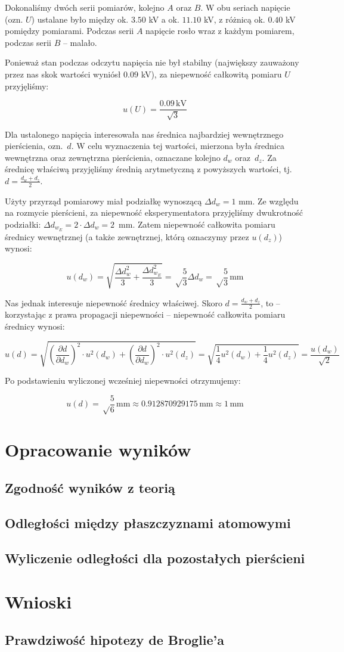 \documentclass[a4paper]{article}
\newlength{\du}
\begin{document}
Dokonaliśmy dwóch serii pomiarów, kolejno $A$ oraz $B$.
W obu seriach napięcie (ozn. $U$) ustalane było między ok. $3.50$ kV a ok. $11.10$ kV, z różnicą ok. $0.40$ kV pomiędzy pomiarami.
Podczas serii $A$ napięcie rosło wraz z każdym pomiarem, podczas serii $B$ -- malało.

Ponieważ stan podczas odczytu napięcia nie był stabilny (największy zauważony przez nas skok wartości wyniósł $0.09$ kV), za niepewność całkowitą pomiaru $U$ przyjęliśmy:

$$u(U) = \frac{0.09 \, \text{kV}}{\sqrt 3}$$

Dla ustalonego napięcia interesowała nas średnica najbardziej wewnętrznego pierścienia, ozn.~$d$.
W celu wyznaczenia tej wartości, mierzona była średnica wewnętrzna oraz zewnętrzna pierścienia, oznaczane kolejno $d_w$ oraz~$d_z$.
Za średnicę właściwą przyjęliśmy średnią arytmetyczną z powyższych wartości, tj.~$d = \frac {d_w + d_z}{2}$.

Użyty przyrząd pomiarowy miał podziałkę wynoszącą $\Delta d_w = 1$ mm.
Ze względu na rozmycie pierścieni, za niepewność eksperymentatora przyjęliśmy dwukrotność podziałki: $\Delta d_{w_E} = 2 \cdot \Delta d_w = 2$~mm.
Zatem niepewność całkowita pomiaru średnicy wewnętrznej (a także zewnętrznej, którą oznaczymy przez $u(d_z)$) wynosi:

$$u(d_w) = \sqrt{\frac{\Delta d_w^2}{3} + \frac{\Delta d_{w_E}^2}{3}} = \sqrt \frac{5}{3} \Delta d_w = \sqrt \frac{5}{3} \, \text{mm}$$

Nas jednak interesuje niepewność średnicy właściwej.
Skoro $d = \frac {d_w + d_z}{2}$, to -- korzystając z prawa propagacji niepewności -- niepewność całkowita pomiaru średnicy wynosi:

$$u(d) = \sqrt{\left(\frac{\partial d}{\partial d_w}\right)^2 \cdot u^2(d_w) + \left(\frac{\partial d}{\partial d_w}\right)^2 \cdot u^2(d_z)} = \sqrt{\frac{1}{4} u^2(d_w) + \frac{1}{4} u^2(d_z)} = \frac{u(d_w)}{\sqrt{2}}$$

Po podstawieniu wyliczonej wcześniej niepewności otrzymujemy:

$$u(d) = \sqrt \frac{5}{6} \, \text{mm} \approx 0.912870929175 \, \text{mm} \approx 1 \, \text{mm}$$

\section{Opracowanie wyników}

\subsection{Zgodność wyników z teorią}

\subsection{Odległości między płaszczyznami atomowymi}

\subsection{Wyliczenie odległości dla pozostałych pierścieni}

\section{Wnioski}

\subsection{Prawdziwość hipotezy de Broglie'a}
\end{document}

